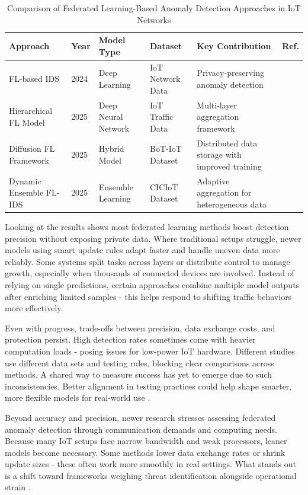 \documentclass[12pt]{article}
\begin{document}
\renewcommand{\arraystretch}{1.2}
\begin{table}[h]
\centering
\caption{Comparison of Federated Learning-Based Anomaly Detection Approaches in IoT Networks}
\label{tab:comparison}
\begin{tabular}{|p{2.8cm}|p{1.3cm}|p{1.8cm}|p{2cm}|p{2.8cm}|p{1.5cm}|}
\hline
\textbf{Approach} & \textbf{Year} & \textbf{Model Type} & \textbf{Dataset} & \textbf{Key Contribution} & \textbf{Ref.} \\
\hline
FL-based IDS & 2024 & Deep Learning & IoT Network Data & Privacy-preserving anomaly detection & \cite{paper13} \\
\hline
Hierarchical FL Model & 2025 & Deep Neural Network & IoT Traffic Data & Multi-layer aggregation framework & \cite{paper6} \\
\hline
Diffusion FL Framework & 2025 & Hybrid Model & BoT-IoT Dataset & Distributed data storage with improved training & \cite{paper4} \\
\hline
Dynamic Ensemble FL-IDS & 2025 & Ensemble Learning & CICIoT Dataset & Adaptive aggregation for heterogeneous data & \cite{paper8} \\
\hline
\end{tabular}
\end{table}

Looking at the results shows most federated learning methods boost detection precision without exposing private data. Where traditional setups struggle, newer models using smart update rules adapt faster and handle uneven data more reliably. Some systems split tasks across layers or distribute control to manage growth, especially when thousands of connected devices are involved. Instead of relying on single predictions, certain approaches combine multiple model outputs after enriching limited samples - this helps respond to shifting traffic behaviors more effectively.

Even with progress, trade-offs between precision, data exchange costs, and protection persist. High detection rates sometimes come with heavier computation loads - posing issues for low-power IoT hardware. Different studies use different data sets and testing rules, blocking clear comparisons across methods. A shared way to measure success has yet to emerge due to such inconsistencies. Better alignment in testing practices could help shape smarter, more flexible models for real-world use \cite{paper1,paper2,paper3,paper4}.

Beyond accuracy and precision, newer research stresses assessing federated anomaly detection through communication demands and computing needs. Because many IoT setups face narrow bandwidth and weak processors, leaner models become necessary. Some methods lower data exchange rates or shrink update sizes - these often work more smoothly in real settings. What stands out is a shift toward frameworks weighing threat identification alongside operational strain \cite{paper5,paper6}.
\end{document}
